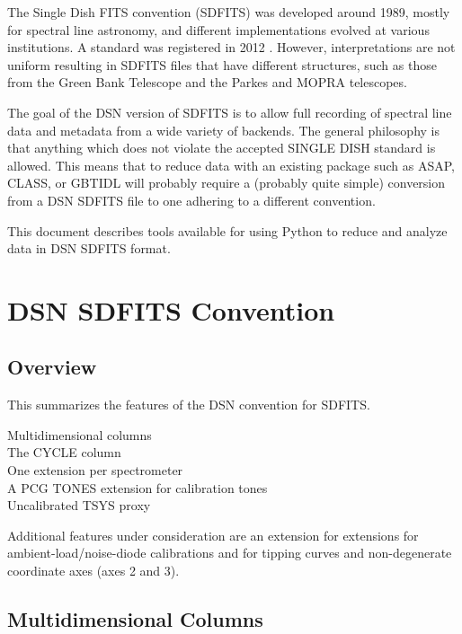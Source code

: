 \documentclass[letterpaper,11pt]{book}
\begin{document}
The Single Dish FITS convention \cite{Liszt1995} (SDFITS) was developed around
1989, mostly for spectral line astronomy, and different implementations evolved
at various institutions.  A standard was registered in 2012 \cite{Pence2012}.
However, interpretations are not uniform resulting in SDFITS files that have
different structures, such as those from the Green Bank Telescope and the Parkes
and MOPRA telescopes.

The goal of the DSN version of SDFITS is to allow full recording of spectral
line data and metadata from a wide variety of backends. The general philosophy
is that anything which does not violate the accepted SINGLE DISH standard is
allowed.  This means that to reduce data with an existing package such as
ASAP, CLASS, or GBTIDL will probably require a (probably quite simple) conversion
from a DSN SDFITS file to one adhering to a different convention.

This document describes tools available for using Python to reduce and analyze
data in DSN SDFITS format.

\chapter{DSN SDFITS Convention}\label{chap:conventions}

\section{Overview}

This summarizes the features of the DSN convention for SDFITS.
\begin{description}
\item[Multidimensional columns] 
\item[The {\ttfamily CYCLE} column]
\item[One extension per spectrometer]
\item[A {\ttfamily PCG TONES} extension for calibration tones]
\item[Uncalibrated {\ttfamily TSYS} proxy]
\end{description}
Additional features under consideration are an extension for extensions for
ambient-load/noise-diode calibrations and for tipping curves and
non-degenerate coordinate axes (axes 2 and 3).


\section{Multidimensional Columns}
\end{document}
